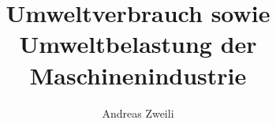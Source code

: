 \documentclass{az_article}
\title{\textbf{Umweltverbrauch sowie Umweltbelastung der Maschinenindustrie}}
\author{Andreas Zweili}
\begin{document}

\tableofcontents


\newpage
\nocite{*}


\end{document}
